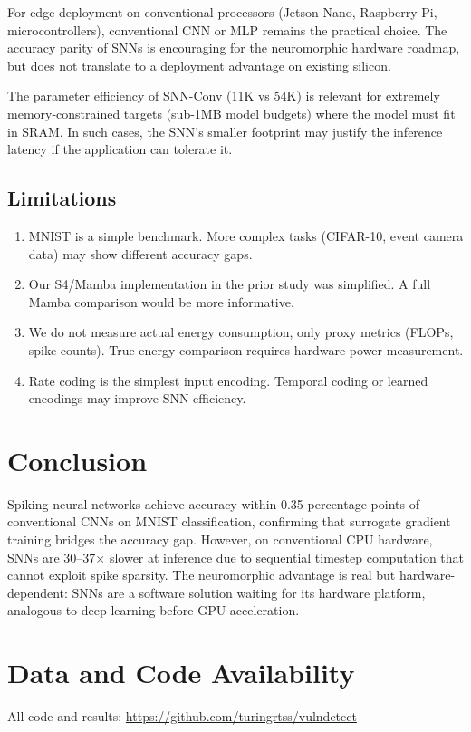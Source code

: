 \documentclass[11pt,a4paper]{article}
\begin{document}
For edge deployment on conventional processors (Jetson Nano, Raspberry Pi, microcontrollers), conventional CNN or MLP remains the practical choice. The accuracy parity of SNNs is encouraging for the neuromorphic hardware roadmap, but does not translate to a deployment advantage on existing silicon.

The parameter efficiency of SNN-Conv (11K vs 54K) is relevant for extremely memory-constrained targets (sub-1MB model budgets) where the model must fit in SRAM. In such cases, the SNN's smaller footprint may justify the inference latency if the application can tolerate it.

\subsection{Limitations}

\begin{enumerate}
\item MNIST is a simple benchmark. More complex tasks (CIFAR-10, event camera data) may show different accuracy gaps.
\item Our S4/Mamba implementation in the prior study was simplified. A full Mamba comparison would be more informative.
\item We do not measure actual energy consumption, only proxy metrics (FLOPs, spike counts). True energy comparison requires hardware power measurement.
\item Rate coding is the simplest input encoding. Temporal coding or learned encodings may improve SNN efficiency.
\end{enumerate}

\section{Conclusion}

Spiking neural networks achieve accuracy within 0.35 percentage points of conventional CNNs on MNIST classification, confirming that surrogate gradient training bridges the accuracy gap. However, on conventional CPU hardware, SNNs are 30--37$\times$ slower at inference due to sequential timestep computation that cannot exploit spike sparsity. The neuromorphic advantage is real but hardware-dependent: SNNs are a software solution waiting for its hardware platform, analogous to deep learning before GPU acceleration.

\section*{Data and Code Availability}
All code and results: \url{https://github.com/turingrtss/vulndetect}
\end{document}
